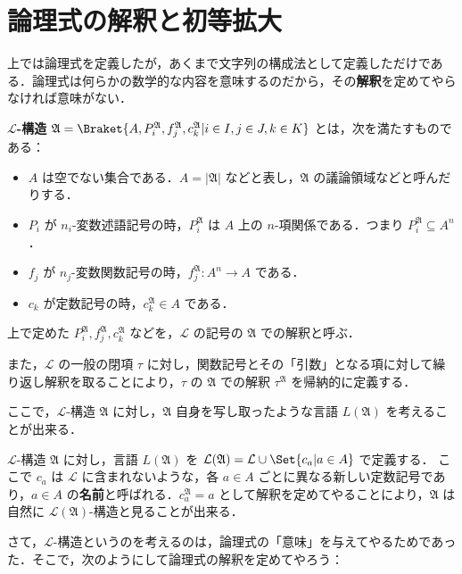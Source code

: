 \documentclass[a4j,xelatex,ja=standard]{ltjsarticle}
\begin{document}
\section{論理式の解釈と初等拡大}
上では論理式を定義したが，あくまで文字列の構成法として定義しただけである．論理式は何らかの数学的な内容を意味するのだから，その{\bfseries 解釈}を定めてやらなければ意味がない．

\begin{definition}
 {\bfseries $\mathcal{L}$-構造} $\mathfrak{A} = \Braket{ A, P_i^\mathfrak{A}, f_j^\mathfrak{A}, c_k^\mathfrak{A} | i \in I, j \in J, k \in K }$ とは，次を満たすものである：
 \begin{itemize}
  \item $A$ は空でない集合である．$A = |\mathfrak{A}|$ などと表し，$\mathfrak{A}$ の議論領域などと呼んだりする．
  \item $P_i$ が $n_i$-変数述語記号の時，$P_i^\mathfrak{A}$ は $A$ 上の $n$-項関係である．つまり $P_i^\mathfrak{A} \subseteq A^n$．
  \item $f_j$ が $n_j$-変数関数記号の時，$f_j^\mathfrak{A}: A^n \rightarrow A$ である．
  \item $c_k$ が定数記号の時，$c_k^\mathfrak{A} \in A$ である．
 \end{itemize}
 上で定めた $P_i^\mathfrak{A}, f_j^\mathfrak{A}, c_k^\mathfrak{A}$ などを，$\mathcal{L}$ の記号の $\mathfrak{A}$ での解釈と呼ぶ．

 また，$\mathcal{L}$ の一般の閉項 $\tau$ に対し，関数記号とその「引数」となる項に対して繰り返し解釈を取ることにより，$\tau$ の $\mathfrak{A}$ での解釈 $\tau^\mathfrak{A}$ を帰納的に定義する．
\end{definition}

ここで，$\mathcal{L}$-構造 $\mathfrak{A}$ に対し，$\mathfrak{A}$ 自身を写し取ったような言語 $L(\mathfrak{A})$ を考えることが出来る．

\begin{definition}
 $\mathcal{L}$-構造 $\mathfrak{A}$ に対し，言語 $L(\mathfrak{A})$ を
  $\mathcal{L}(\mathfrak{A}) = \mathcal{L} \cup  \Set{ c_a | a \in A }$ で定義する．
 ここで $c_a$ は $\mathcal{L}$ に含まれないような，各 $a \in A$ ごとに異なる新しい定数記号であり，$a \in A$ の{\bfseries 名前}と呼ばれる．$c_a^\mathfrak{A} = a$ として解釈を定めてやることにより，$\mathfrak{A}$ は自然に $\mathcal{L}(\mathfrak{A})$-構造と見ることが出来る．
\end{definition}

さて，$\mathcal{L}$-構造というのを考えるのは，論理式の「意味」を与えてやるためであった．そこで，次のようにして論理式の解釈を定めてやろう：
\end{document}
